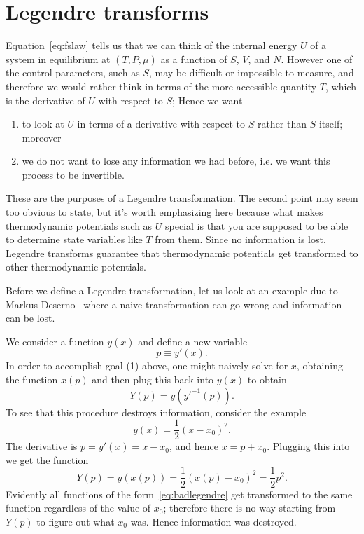 \section{Legendre transforms}

Equation~\eqref{eq:fslaw} tells us that we can think of the internal energy
$U$ of a system in equilibrium at $(T,P,\mu)$ as a function of $S$, $V$, and
$N$. However one of the control parameters, such as $S$, may be
difficult or impossible to measure, and therefore we would rather
think in terms of the more accessible quantity $T$, which 
is the derivative of $U$ with respect to $S$; 
Hence we want 
\begin{enumerate}
\item to look at $U$ in terms of a derivative with respect to $S$ rather 
      than $S$ itself; moreover 
\item we do not want to lose any information we had before, i.e. we want this
      process to be invertible. 
\end{enumerate}
These are the purposes of a Legendre transformation. The second point 
may seem too obvious to state, but it's worth emphasizing here because 
what makes thermodynamic potentials such as $U$ special is that you are 
supposed to be able to determine state variables like $T$ from them. 
Since no information is lost, Legendre transforms guarantee that 
thermodynamic potentials get transformed to other thermodynamic potentials.

Before we define a Legendre transformation, let us look at an example
due to Markus Deserno~\cite{deserno} where a naive transformation can go
wrong and information can be lost. 
\begin{example*}{}
We consider a function $y(x)$ and define a new variable
\begin{equation}\label{eq:xlegendre}
  p\equiv y'(x).
\end{equation}
In order to accomplish goal (1) above, one might naively solve
 for $x$, obtaining the function $x(p)$
and then plug this back into $y(x)$ to obtain
\begin{equation}
  Y(p)=y\left(y'^{-1}(p)\right).
\end{equation}
To see that this procedure destroys information, consider the example
\begin{equation}\label{eq:badlegendre}
  y(x)=\frac{1}{2}(x-x_0)^2.
\end{equation}
The derivative is $p=y'(x)=x-x_0$, and hence $x=p+x_0$. Plugging this
into  we get the function
\begin{equation}
  Y(p)=y(x(p))=\frac{1}{2}\left(x(p)-x_0\right)^2=\frac{1}{2}p^2.
\end{equation}
Evidently all functions of the form~\eqref{eq:badlegendre} get transformed
to the same function regardless of the value of $x_0$; therefore there is
no way starting from $Y(p)$ to figure out what $x_0$ was. Hence
information was destroyed.
\end{example*}

